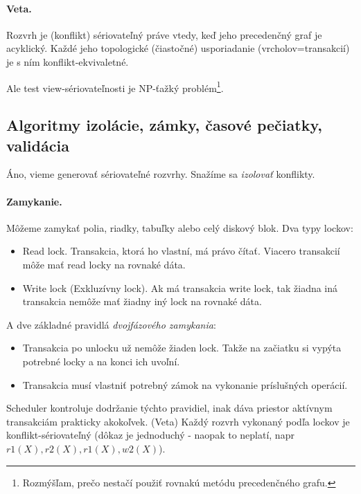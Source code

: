 \documentclass[10pt,a4paper]{article}
\begin{document}
\paragraph{Veta.} Rozvrh je (konflikt) sériovateľný práve vtedy, keď jeho precedenčný graf je acyklický. Každé jeho topologické (čiastočné) usporiadanie (vrcholov=transakcií) je s ním konflikt-ekvivaletné.  

Ale test view-sériovateľnosti je NP-ťažký problém\footnote{
Rozmýšľam, prečo nestačí použiť rovnakú metódu precedenčného grafu. 
}. 


\subsection{Algoritmy izolácie, zámky, časové pečiatky, validácia}

Áno, vieme generovať sériovateľné rozvrhy. Snažíme sa \emph{izolovať} konflikty. 

\paragraph{Zamykanie.}
Môžeme zamykať polia, riadky, tabuľky alebo celý diskový blok. Dva typy lockov: 
\begin{itemize}
\item Read lock. Transakcia, ktorá ho vlastní, má právo čítať. Viacero transakcií môže mať read locky na rovnaké dáta. 
\item Write lock (Exkluzívny lock). Ak má transakcia write lock, tak žiadna iná transakcia nemôže mať žiadny iný lock na rovnaké dáta. 
\end{itemize}

A dve základné pravidlá \emph{dvojfázového zamykania}: 
\begin{itemize}
\item Transakcia po unlocku už nemôže žiaden lock. Takže na začiatku si vypýta potrebné locky a na konci ich uvoľní. 
\item Transakcia musí vlastniť potrebný zámok na vykonanie príslušných operácií. 
\end{itemize}

Scheduler kontroluje dodržanie týchto pravidiel, inak dáva priestor aktívnym transakciám prakticky akokoľvek. 
(Veta) Každý rozvrh vykonaný podľa lockov je konflikt-sériovateľný (dôkaz je jednoduchý - naopak to neplatí, napr $r1(X), r2(X), r1(X), w2(X)$). 
\end{document}
